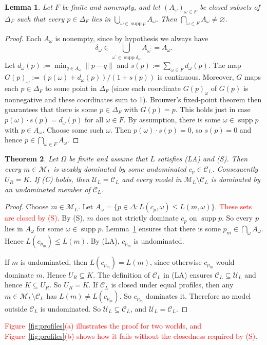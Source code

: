 \documentclass[11pt]{article}
\newtheorem{theorem}{Theorem}[section]
\newtheorem{lemma}[theorem]{Lemma}
\theoremstyle{definition}
\theoremstyle{remark}
\newcommand{\M}{\mathcal M}
\newcommand{\C}{\mathcal C}
\newcommand{\U}{\mathcal U}
\newcommand{\supp}{\operatorname{supp}}
\begin{document}
\begin{lemma}\label{lem:kkm}
Let $F$ be finite and nonempty, and let $(A_\omega)_{\omega\in F}$ be closed subsets of $\Delta_F$ such that every $p\in\Delta_F$ lies in $\bigcup_{\omega\in\supp p}A_\omega$. Then $\bigcap_{\omega\in F}A_\omega\ne\varnothing$.
\end{lemma}
\begin{proof}
Each $A_\omega$ is nonempty, since by hypothesis we always have 
\[
\delta_\omega\in\bigcup_{\omega^\prime\in\supp \delta_\omega}A_{\omega^\prime}=A_\omega.
\]
Let $d_\omega(p):=\min_{q\in A_\omega}\lVert p-q \rVert$ and $s(p):=\sum_{\omega\in F} d_\omega(p)$. The map $G(p)_\omega:=(p(\omega)+d_\omega(p))/(1+s(p))$ is continuous. Moreover, $G$ maps each $p\in\Delta_F$ to some point in $\Delta_F$ (since each coordinate $G(p)_\omega$ of $G(p)$ is nonnegative and these coordinates sum to 1). Brouwer's fixed-point theorem then guarantees that there is some $p\in\Delta_F$ with $G(p)=p$. This holds just in case $p(\omega)\cdot s(p)=d_\omega(p)$ for all $\omega\in F$. By assumption, there is some $\omega\in\supp p$ with $p\in A_\omega$. Choose some such $\omega$. Then $p(\omega)\cdot s(p)=0$, so $s(p)=0$ and hence $p\in\bigcap_{\omega\in F}A_\omega$.
\end{proof}
\begin{theorem}\label{thm:kkm}
Let $\Omega$ be finite and assume that $L$ satisfies (LA) and (S). Then every $m\in\M_L$ is weakly dominated by some undominated $c_p\in\C_L$. Consequently $U_R=K$. If (C) holds, then $\U_L=\C_L$ and every model in $\M_L\setminus\C_L$ is dominated by an undominated member of $\C_L$. 
\end{theorem}
\begin{proof}
Choose $m\in\M_L$. Let $A_\omega=\{p\in\Delta:L(c_p,\omega)\le L(m,\omega)\}$. \textcolor{red}{These sets are closed by (S).} By (S), $m$ does not strictly dominate $c_p$ on $\supp p$. So every $p$ lies in $A_\omega$ for some $\omega\in\supp p$. Lemma~\ref{lem:kkm} ensures that there is some $p_m\in\bigcap_\omega A_\omega$. Hence $L(c_{p_m})\le L(m)$. By (LA), $c_{p_m}$ is undominated.

If $m$ is undominated, then $L(c_{p_m})=L(m)$, since otherwise $c_{p_m}$ would dominate $m$. Hence $U_R\subseteq K$. The definition of $\C_L$ in (LA) ensures $\C_L\subseteq\U_L$ and hence $K\subseteq U_R$. So $U_R = K$. If $\C_L$ is closed under equal profiles, then any $m\in\M_L\setminus\C_L$ has $L(m)\ne L(c_{p_m})$. So $c_{p_m}$ dominates it. Therefore no model outside $\C_L$ is undominated. So $\U_L\subseteq\C_L$, and $\U_L=\C_L$.
\end{proof}
\textcolor{red}{Figure~\ref{fig:profiles}(a) illustrates the proof for two worlds, and Figure~\ref{fig:profiles}(b) shows how it fails without the closedness required by (S).}
\end{document}
